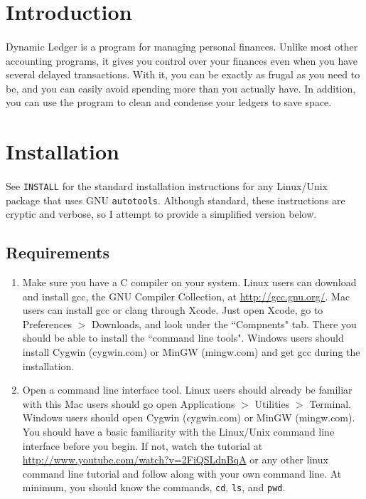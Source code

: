 \documentclass{article}
\begin{document}
\begin{flushleft}

\section{Introduction}

\paragraph{} Dynamic Ledger is a program for managing personal finances. Unlike most other accounting programs, it gives you control over your finances even when you have several delayed transactions. With it, you can be exactly as frugal as you need to be, and you can easily avoid spending more than you actually have. In addition, you can use the program to clean and condense your ledgers to save space.


\section{Installation}

\paragraph{} See {\tt INSTALL} for the standard installation instructions for any Linux/Unix package that uses GNU {\tt autotools}. Although standard, these instructions are cryptic and verbose, so I attempt to provide a simplified version below. 

\subsection{Requirements}
\begin{enumerate}
\item Make sure you have a C compiler on your system. Linux users can download and install gcc, the GNU Compiler Collection, at \url{http://gcc.gnu.org/}. Mac users can install gcc or clang through Xcode. Just open Xcode, go to Preferences $>$ Downloads, and look under the ``Compnents" tab. There you should be able to install the ``command line tools". Windows users should install Cygwin (cygwin.com) or MinGW (mingw.com) and get gcc during the installation.
\item Open a command line interface tool. Linux users should already be familiar with this Mac users should go open Applications $>$ Utilities $>$ Terminal. Windows users should open Cygwin (cygwin.com) or MinGW (mingw.com). You should have a basic familiarity with the Linux/Unix command line interface before you begin. If not, watch the tutorial at \url{http://www.youtube.com/watch?v=2FiQSLdnBqA} or any other linux command line tutorial and follow along with your own command line. At minimum, you should know the commands, {\tt cd}, {\tt ls}, and {\tt pwd}.
\end{enumerate}



\end{flushleft}
\end{document}

